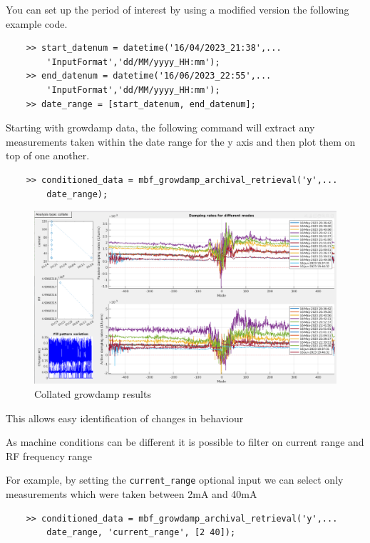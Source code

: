 \documentclass{report}
\begin{document}
You can set up the period of interest by using a modified version the following example code. 
\begin{verbatim}
    >> start_datenum = datetime('16/04/2023_21:38',...
        'InputFormat','dd/MM/yyyy_HH:mm'); 
    >> end_datenum = datetime('16/06/2023_22:55',...
        'InputFormat','dd/MM/yyyy_HH:mm'); 
    >> date_range = [start_datenum, end_datenum]; 
\end{verbatim}
Starting with growdamp data, the following command will extract any measurements taken within the date range for the y axis and then plot them on top of one another. 
\begin{verbatim}
    >> conditioned_data = mbf_growdamp_archival_retrieval('y',...
        date_range); 
\end{verbatim}
\begin{figure}[h]
    \centering
    \includegraphics[width=1\linewidth]{growdamp_collate.png}
    \caption{Collated growdamp results}
    \label{fig:growdamp_collate}
\end{figure}

This allows easy identification of changes in behaviour 


As machine conditions can be different it is possible to filter on current range and RF frequency range 

For example, by setting the \verb+current_range+ optional input we can select only measurements which were taken between 2mA and 40mA

\begin{verbatim}
    >> conditioned_data = mbf_growdamp_archival_retrieval('y',...
        date_range, 'current_range', [2 40]); 
\end{verbatim}
\end{document}
